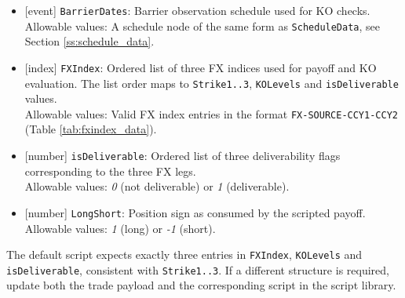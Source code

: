 \begin{itemize}
	\item{}[event] \lstinline!BarrierDates!: Barrier observation schedule used for KO checks. \\
		Allowable values: A schedule node of the same form as \lstinline!ScheduleData!, see
		Section \ref{ss:schedule_data}.

	\item{}[index] \lstinline!FXIndex!: Ordered list of three FX indices used for payoff and KO
		evaluation. The list order maps to \lstinline!Strike1..3!, \lstinline!KOLevels! and
		\lstinline!isDeliverable! values. \\
		Allowable values: Valid FX index entries in the format
		\lstinline!FX-SOURCE-CCY1-CCY2! (Table \ref{tab:fxindex_data}).

	\item{}[number] \lstinline!isDeliverable!: Ordered list of three deliverability flags corresponding
		to the three FX legs. \\
		Allowable values: \emph{0} (not deliverable) or \emph{1} (deliverable).

	\item{}[number] \lstinline!LongShort!: Position sign as consumed by the scripted payoff. \\
		Allowable values: \emph{1} (long) or \emph{-1} (short).
\end{itemize}

The default script expects exactly three entries in \lstinline!FXIndex!,
\lstinline!KOLevels! and \lstinline!isDeliverable!, consistent with
\lstinline!Strike1..3!. If a different structure is required, update both the
trade payload and the corresponding script in the script library.
